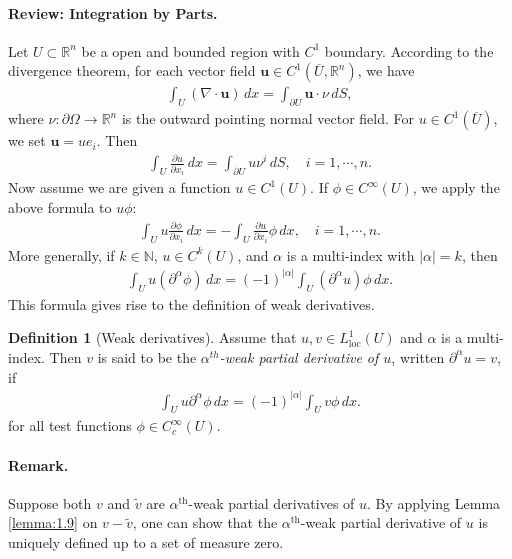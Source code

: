 \documentclass{article}
\numberwithin{equation}{section}
\newcommand{\bbR}{\mathbb{R}}
\newcommand{\loc}{\mathrm{loc}}
\newcommand{\ol}{\overline}
\newcommand{\wt}{\widetilde}
\theoremstyle{plain}
\theoremstyle{definition}
\newtheorem{definition}[theorem]{Definition}
\begin{document}
\paragraph{Review: Integration by Parts.} Let $U\subset\bbR^n$ be a open and bounded region with $C^1$ boundary. According to the divergence theorem, for each vector field $\mathbf{u}\in C^1(\ol{U},\bbR^n)$, we have
\begin{align*}
	\int_U(\nabla\cdot\mathbf{u})\,dx=\int_{\partial U}\mathbf{u}\cdot\nu\,dS,
\end{align*}
where $\nu:\partial\Omega\to\bbR^n$ is the outward pointing normal vector field. For $u\in C^1(\overline{U})$, we set $\mathbf{u}=ue_i$. Then
\begin{align*}
	\int_U \frac{\partial u}{\partial x_i}\,dx = \int_{\partial U} u\nu^i\,dS,\quad i=1,\cdots,n.
\end{align*}
Now assume we are given a function $u\in C^1(U)$. If $\phi\in C^\infty(U)$, we apply the above formula to $u\phi$:
\begin{align*}
	\int_U u\frac{\partial\phi}{\partial x_i}\,dx = -\int_U \frac{\partial u}{\partial x_i}\phi\,dx,\quad i=1,\cdots,n.
\end{align*}
More generally, if $k\in\mathbb{N}$, $u\in C^k(U)$, and $\alpha$ is a multi-index with $\vert\alpha\vert=k$, then
\begin{align*}
	\int_U u(\partial^\alpha\phi)\,dx=(-1)^{\vert\alpha\vert}\int_U(\partial^\alpha u)\phi\,dx.
\end{align*}
This formula gives rise to the definition of weak derivatives.
\begin{definition}[Weak derivatives]\label{def:2.3}
Assume that  $u,v\in L^1_\loc(U)$ and $\alpha$ is a multi-index. Then $v$ is said to be the \textit{$\alpha^{th}$-weak partial derivative of $u$}, written $\partial^\alpha u=v$, if
\begin{align*}
	\int_U u \partial^\alpha\phi\,dx=(-1)^{\vert\alpha\vert}\int_Uv\phi\,dx.
\end{align*}
for all test functions $\phi\in C_c^\infty(U)$.
\end{definition}

\paragraph{Remark.} Suppose both $v$ and $\wt{v}$ are $\alpha^\text{th}$-weak partial derivatives of $u$. By applying Lemma \ref{lemma:1.9} on $v-\wt{v}$, one can show that the $\alpha^\text{th}$-weak partial derivative of $u$ is uniquely defined up to a set of measure zero. 
\end{document}
